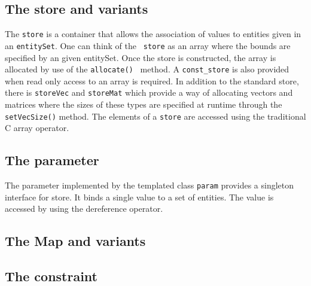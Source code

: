 \documentclass{article}
\begin{document}
\subsection{The store and variants}

The {\tt store} is a container that allows the association of values
to entities given in an {\tt entitySet}.  One can think of the {\tt
  store} as an array where the bounds are specified by an given
entitySet.  Once the store is constructed, the array is allocated by
use of the {\tt allocate() } method.  A {\tt const\_store} is also
provided when read only access to an array is required.  In addition
to the standard store, there is {\tt storeVec} and {\tt storeMat}
which provide a way of allocating vectors and matrices where the sizes
of these types are specified at runtime through the {\tt setVecSize()}
method.  The elements of a {\tt store} are accessed using the
traditional C array operator.

\subsection{The parameter}

The parameter implemented by the templated class {\tt param} provides
a singleton interface for store.  It binds a single value to a set of
entities.  The value is accessed by using the dereference operator.

\subsection{The Map and variants}



\subsection{The constraint}
\end{document}
